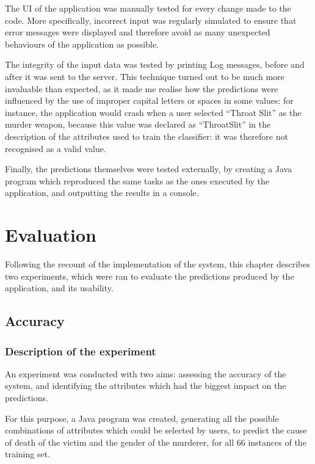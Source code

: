 \documentclass{mproj}
\begin{document}
The UI of the application was manually tested for every change made to the code. More specifically, incorrect input was regularly simulated to ensure that error messages were displayed and therefore avoid as many unexpected behaviours of the application as possible.

The integrity of the input data was tested by printing Log messages, before and after it was sent to the server. This technique turned out to be much more invaluable than expected, as it made me realise how the predictions were influenced by the use of improper capital letters or spaces in some values: for instance, the application would crash when a user selected ``Throat Slit'' as the murder weapon, because this value was declared as ``ThroatSlit'' in the description of the attributes used to train the classifier: it was therefore not recognised as a valid value. 

Finally, the predictions themselves were tested externally, by creating a Java program which reproduced the same tasks as the ones executed by the application, and outputting the results in a console. 

\chapter{Evaluation}\label{evaluation}

Following the recount of the implementation of the system, this chapter describes two experiments, which were ran to evaluate the predictions produced by the application, and its usability.

\section{Accuracy}

\subsection*{Description of the experiment}

An experiment was conducted with two aims: assessing the accuracy of the system, and identifying the attributes which had the biggest impact on the predictions. 

For this purpose, a Java program was created, generating all the possible combinations of attributes which could be selected by users, to predict the cause of death of the victim and the gender of the murderer, for all 66 instances of the training set.
\end{document}
